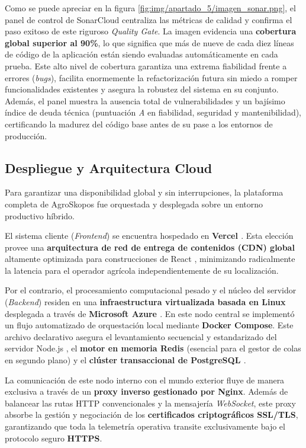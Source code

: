 Como se puede apreciar en la figura \ref{fig:img/apartado_5/imagen_sonar.png}, el panel de control de SonarCloud centraliza las métricas de calidad y confirma el paso exitoso de este riguroso \textit{Quality Gate}. La imagen evidencia una \textbf{cobertura global superior al 90\%}, lo que significa que más de nueve de cada diez líneas de código de la aplicación están siendo evaluadas automáticamente en cada prueba. Este alto nivel de cobertura garantiza una extrema fiabilidad frente a errores (\textit{bugs}), facilita enormemente la refactorización futura sin miedo a romper funcionalidades existentes y asegura la robustez del sistema en su conjunto. Además, el panel muestra la ausencia total de vulnerabilidades y un bajísimo índice de deuda técnica (puntuación \textit{A} en fiabilidad, seguridad y mantenibilidad), certificando la madurez del código base antes de su pase a los entornos de producción.


\subsection{Despliegue y Arquitectura Cloud}
Para garantizar una disponibilidad global y sin interrupciones, la plataforma completa de AgroSkopos fue orquestada y desplegada sobre un entorno productivo híbrido.

El sistema cliente (\textit{Frontend}) se encuentra hospedado en \textbf{Vercel \cite{vercel}}. Esta elección provee una \textbf{arquitectura de red de entrega de contenidos (CDN) global} altamente optimizada para construcciones de React \cite{react}, minimizando radicalmente la latencia para el operador agrícola independientemente de su localización.

Por el contrario, el procesamiento computacional pesado y el núcleo del servidor (\textit{Backend}) residen en una \textbf{infraestructura virtualizada basada en Linux} desplegada a través de \textbf{Microsoft Azure \cite{azure}}. En este nodo central se implementó un flujo automatizado de orquestación local mediante \textbf{Docker \cite{docker} Compose}. Este archivo declarativo asegura el levantamiento secuencial y estandarizado del servidor Node.js \cite{nodejs}, el \textbf{motor en memoria Redis \cite{redis}} (esencial para el gestor de colas en segundo plano) y el \textbf{clúster transaccional de PostgreSQL \cite{postgresql}}. 

La comunicación de este nodo interno con el mundo exterior fluye de manera exclusiva a través de un \textbf{proxy inverso gestionado por Nginx}. Además de balancear las rutas HTTP convencionales y la mensajería \textit{WebSocket}, este proxy absorbe la gestión y negociación de los \textbf{certificados criptográficos SSL/TLS}, garantizando que toda la telemetría operativa transite exclusivamente bajo el protocolo seguro \textbf{HTTPS}.
